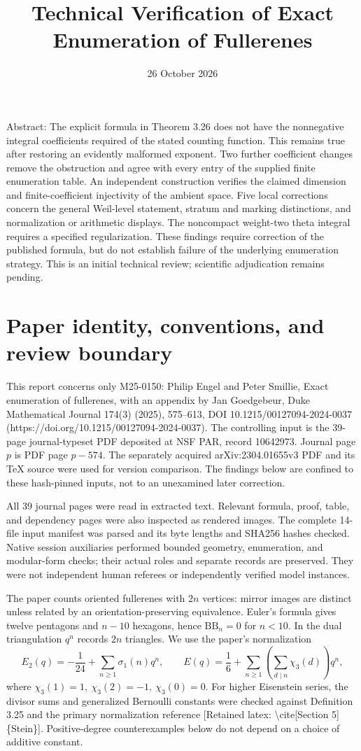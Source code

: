 \documentclass[10pt]{article}
\title{Technical Verification of
Exact Enumeration of Fullerenes}
\author{}
\date{26 October 2026}
\begin{document}
\maketitle
Abstract: The explicit formula in Theorem 3.26 does not have the nonnegative integral coefficients required of the stated counting function. This remains true after restoring an evidently malformed exponent. Two further coefficient changes remove the obstruction and agree with every entry of the supplied finite enumeration table. An independent construction verifies the claimed dimension and finite-coefficient injectivity of the ambient space. Five local corrections concern the general Weil-level statement, stratum and marking distinctions, and normalization or arithmetic displays. The noncompact weight-two theta integral requires a specified regularization. These findings require correction of the published formula, but do not establish failure of the underlying enumeration strategy. This is an initial technical review; scientific adjudication remains pending.\par
\section*{Paper identity, conventions, and review boundary}
This report concerns only M25-0150: Philip Engel and Peter Smillie, Exact enumeration of fullerenes, with an appendix by Jan Goedgebeur, Duke Mathematical Journal 174(3) (2025), 575–613, DOI 10.1215/00127094-2024-0037 (https://doi.org/10.1215/00127094-2024-0037). The controlling input is the 39-page journal-typeset PDF deposited at NSF PAR, record 10642973. Journal page \(p\) is PDF page \(p-574\). The separately acquired arXiv:2304.01655v3 PDF and its TeX source were used for version comparison. The findings below are confined to these hash-pinned inputs, not to an unexamined later correction.\par
All 39 journal pages were read in extracted text. Relevant formula, proof, table, and dependency pages were also inspected as rendered images. The complete 14-file input manifest was parsed and its byte lengths and SHA256 hashes checked. Native session auxiliaries performed bounded geometry, enumeration, and modular-form checks; their actual roles and separate records are preserved. They were not independent human referees or independently verified model instances.\par
The paper counts oriented fullerenes with \(2n\) vertices: mirror images are distinct unless related by an orientation-preserving equivalence. Euler’s formula gives twelve pentagons and \(n-10\) hexagons, hence \(\mathrm{BB}_n=0\) for \(n<10\). In the dual triangulation \(q^n\) records \(2n\) triangles. We use the paper’s normalization \[E_2(q)=-\frac1{24}+\sum_{n\ge1}\sigma_1(n)q^n,\qquad
 E(q)=\frac16+\sum_{n\ge1}\left(\sum_{d\mid n}\chi_3(d)\right)q^n,\] where \(\chi_3(1)=1,\ \chi_3(2)=-1,\ \chi_3(0)=0\). For higher Eisenstein series, the divisor sums and generalized Bernoulli constants were checked against Definition 3.25 and the primary normalization reference [Retained latex: \textbackslash{}cite[Section 5]\{Stein\}]. Positive-degree counterexamples below do not depend on a choice of additive constant.\par
\end{document}
